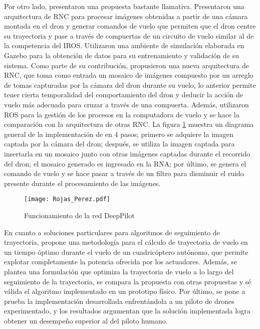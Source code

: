 Por otro lado, \citet{rojas2020deeppilot} presentaron una propuesta bastante llamativa. Presentaron una arquitectura de RNC para procesar imágenes obtenidas a partir de una cámara montada en el dron y generar comandos de vuelo que permiten que el dron centre su trayectoria y pase a través de compuertas de un circuito de vuelo similar al de la competencia del IROS. Utilizaron una ambiente de simulación elaborada en Gazebo para la obtención de datos para su entrenamiento y validación de su sistema. Como parte de su contribución, propusieron una nueva arquitectura de RNC, que toma como entrada un mosaico de imágenes compuesto por un arreglo de tomas capturadas por la cámara del dron durante su vuelo, lo anterior permite tener cierta temporalidad del comportamiento del dron y deducir la acción de vuelo más adecuada para cruzar a través de una compuerta.
Además, utilizaron ROS para la gestión de los procesos en la computadora de vuelo y se hace la comparación con la arquitectura de otras RNC. La figura \ref{fig:Rojas_Perez} muestra un diagrama general de la implementación de \citet{rojas2020deeppilot} en 4 pasos; primero se adquiere la imagen captada por la cámara del dron; después, se utiliza la imagen captada para insertarla en un mosaico junto con otras imágenes captadas durante el recorrido del dron; el mosaico generado es ingresado en la RNA; por último, se genera el comando de vuelo y se hace pasar a través de un filtro para disminuir el ruido presente durante el procesamiento de las imágenes.

\begin{figure}[ht]
    \centering
    \texttt{[image: Rojas\_Perez.pdf]}
    \caption{Funcionamiento de la red DeepPilot \citet{rojas2020deeppilot}}
    \label{fig:Rojas_Perez}
\end{figure}

En cuanto a soluciones particulares para algoritmos de seguimiento de trayectoria, \citet{foehn2021time} propone una metodología para el cálculo de trayectoria de vuelo en un tiempo óptimo durante el vuelo de un cuadricóptero autónomo, que permite explotar completamente la potencia ofrecida por los actuadores. Además, se plantea una formulación que optimiza la trayectoria de vuelo a lo largo del seguimiento de la trayectoria, se compara la propuesta con otras propuestas y sé válida el algoritmo implementado en un prototipo físico. Por último, se pone a prueba la implementación desarrollada enfrentándola a un piloto de drones experimentado, y los resultados argumentan que la solución implementada logra obtener un desempeño superior al del piloto humano.

